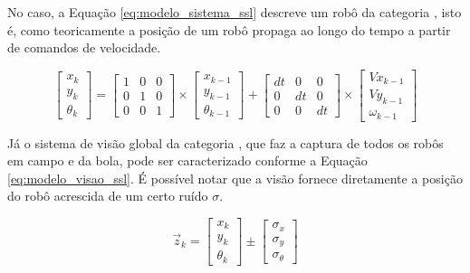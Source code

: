 \documentclass[acronym, symbols, table]{fei}
\begin{document}
		No caso, a Equação \ref{eq:modelo_sistema_ssl} descreve um robô da categoria , isto é, como teoricamente a posição de um robô propaga ao longo do tempo a partir de comandos de velocidade.
		
		\begin{equation}\label{eq:modelo_sistema_ssl}
			\begin{bmatrix}
				x_k \\
				y_k \\
				\theta_k
			\end{bmatrix} = 
			\begin{bmatrix}
				1 & 0 & 0 \\
				0 & 1 & 0 \\
				0 & 0 & 1
			\end{bmatrix} \times
			\begin{bmatrix}
				x_{k-1} \\
				y_{k-1} \\
				\theta_{k-1}
			\end{bmatrix} + 
			\begin{bmatrix}
				dt & 0 & 0 \\
				0 & dt & 0 \\
				0 & 0 & dt
			\end{bmatrix} \times
			\begin{bmatrix}
				Vx_{k-1} \\
				Vy_{k-1} \\
				\omega_{k-1}
			\end{bmatrix}
		\end{equation}
		
		Já o sistema de visão global da categoria , que faz a captura de todos os robôs em campo e da bola, pode ser caracterizado conforme a Equação \ref{eq:modelo_visao_ssl}. É possível notar que a visão fornece diretamente a posição do robô acrescida de um certo ruído $\sigma$.
		
		\begin{equation}\label{eq:modelo_visao_ssl}
			\overrightarrow{z}_k  = 
			\begin{bmatrix}
				x_k \\
				y_k \\
				\theta_k
			\end{bmatrix} \pm
			\begin{bmatrix}
				\sigma_x \\
				\sigma_y \\
				\sigma_{\theta}
			\end{bmatrix}
		\end{equation}
		
\end{document}
